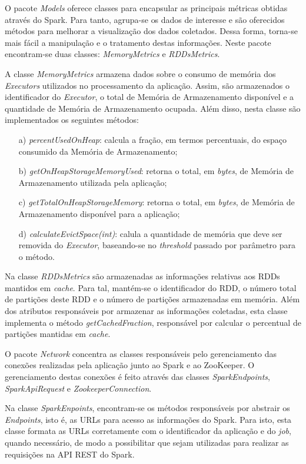 O pacote \textit{Models} oferece classes para encapsular as principais métricas obtidas através do Spark. Para tanto, agrupa-se os dados de interesse e são oferecidos métodos para melhorar a visualização dos dados coletados. Dessa forma, torna-se mais fácil a manipulação e o tratamento destas informações. Neste pacote encontram-se duas classes: \textit{MemoryMetrics} e \textit{RDDsMetrics}. 

A classe \textit{MemoryMetrics} armazena dados sobre o consumo de memória dos \textit{Executors} utilizados no processamento da aplicação. Assim, são armazenados o identificador do \textit{Executor}, o total de Memória de Armazenamento disponível e a quantidade de Memória de Armazenamento ocupada. Além disso, nesta classe são implementados os seguintes métodos:
\begin{enumerate}
    \item[a)] \textit{percentUsedOnHeap}: calcula a fração, em termos percentuais, do espaço consumido da Memória de Armazenamento;
    \item[b)] \textit{getOnHeapStorageMemoryUsed}: retorna o total, em \textit{bytes}, de Memória de Armazenamento utilizada pela aplicação;
    \item[c)] \textit{getTotalOnHeapStorageMemory}: retorna o total, em \textit{bytes}, de Memória de Armazenamento disponível para a aplicação;
    \item[d)] \textit{calculateEvictSpace(int)}: calula a quantidade de memória que deve ser removida do \textit{Executor}, baseando-se no \textit{threshold} passado por parâmetro para o método.
\end{enumerate}

Na classe \textit{RDDsMetrics} são armazenadas as informações relativas aos RDDs mantidos em \textit{cache}. Para tal, mantém-se o identificador do RDD, o número total de partições deste RDD e o número de partições armazenadas em memória. Além dos atributos responsáveis por armazenar as informações coletadas, esta classe implementa o método \textit{getCachedFraction}, responsável por calcular o percentual de partições mantidas em \textit{cache}.

O pacote \textit{Network} concentra as classes responsáveis pelo gerenciamento das conexões realizadas pela aplicação junto ao Spark e ao ZooKeeper. O gerenciamento destas conexões é feito através das classes \textit{SparkEndpoints}, \textit{SparkApiRequest} e \textit{ZookeeperConnection}.

Na classe \textit{SparkEnpoints}, encontram-se os métodos responsáveis por abstrair os \textit{Endpoints}, isto é, as URLs para acesso as informações do Spark. Para isto, esta classe formata as URLs corretamente com o identificador da aplicação e do \textit{job}, quando necessário, de modo a possibilitar que sejam utilizadas para realizar as requisições na API REST do Spark. 


